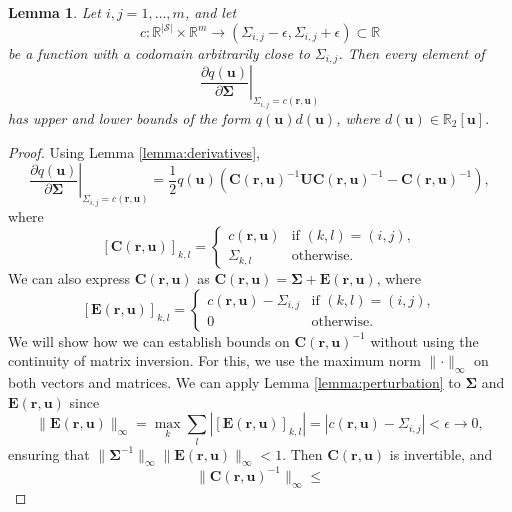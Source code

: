\documentclass{mpaper}
\newtheorem{lemma}[theorem]{Lemma}
\begin{document}
\begin{lemma} \label{lemma:bound3}
  Let $i, j = 1, \dots, m$, and let
  \[
    c : \mathbb{R}^{|\mathcal{S}|} \times \mathbb{R}^m \to (\Sigma_{i,j} - \epsilon,
    \Sigma_{i,j} + \epsilon) \subset \mathbb{R}
  \]
  be a function with a codomain arbitrarily close to $\Sigma_{i,j}$. Then every
  element of
  \[
    \left. \frac{\partial q(\mathbf{u})}{\partial \bm\Sigma} \right|_{\Sigma_{i,j} =
    c(\mathbf{r}, \mathbf{u})}
  \]
  has upper and lower bounds of the form $q(\mathbf{u})d(\mathbf{u})$, where
  $d(\mathbf{u}) \in \mathbb{R}_2[\mathbf{u}]$.
\end{lemma}
\begin{proof}
  Using Lemma \ref{lemma:derivatives},
  \[
    \left. \frac{\partial q(\mathbf{u})}{\partial \bm\Sigma} \right|_{\Sigma_{i,j} =
    c(\mathbf{r}, \mathbf{u})} =
    \frac{1}{2}q(\mathbf{u})(\mathbf{C}(\mathbf{r},
    \mathbf{u})^{-1}\mathbf{UC}(\mathbf{r}, \mathbf{u})^{-1} -
    \mathbf{C}(\mathbf{r}, \mathbf{u})^{-1}),
  \]
  where
  \[
    [\mathbf{C}(\mathbf{r}, \mathbf{u})]_{k,l} =
    \begin{cases}
      c(\mathbf{r}, \mathbf{u}) & \text{if } (k, l) = (i, j), \\
      \Sigma_{k,l} & \text{otherwise.}
    \end{cases}
  \]
  We can also express $\mathbf{C}(\mathbf{r},\mathbf{u})$ as
  $\mathbf{C}(\mathbf{r}, \mathbf{u}) = \bm\Sigma + \mathbf{E}(\mathbf{r},
  \mathbf{u})$, where
  \[
    [\mathbf{E}(\mathbf{r}, \mathbf{u})]_{k,l} =
    \begin{cases}
      c(\mathbf{r}, \mathbf{u}) - \Sigma_{i,j} & \text{if } (k, l) = (i, j), \\
      0 & \text{otherwise.}
    \end{cases}
  \]
  We will show how we can establish bounds on $\mathbf{C}(\mathbf{r},
  \mathbf{u})^{-1}$ without using the continuity of matrix inversion. For this,
  we use the maximum norm $\lVert \cdot \rVert_\infty$ on both vectors and
  matrices. We can apply Lemma \ref{lemma:perturbation} to $\bm\Sigma$ and
  $\mathbf{E}(\mathbf{r}, \mathbf{u})$ since
  \[
    \lVert \mathbf{E}(\mathbf{r}, \mathbf{u}) \rVert_\infty = \max_k \sum_l
    |[\mathbf{E}(\mathbf{r}, \mathbf{u})]_{k,l}| = |c(\mathbf{r}, \mathbf{u}) -
    \Sigma_{i,j}| < \epsilon \to 0,
  \]
  ensuring that $\lVert \bm\Sigma^{-1} \rVert_\infty
  \lVert \mathbf{E}(\mathbf{r}, \mathbf{u}) \rVert_\infty < 1$. Then
  $\mathbf{C}(\mathbf{r}, \mathbf{u})$ is invertible, and
  \[
    \lVert \mathbf{C}(\mathbf{r}, \mathbf{u})^{-1} \rVert_\infty \le
\]
\end{proof}
\end{document}
